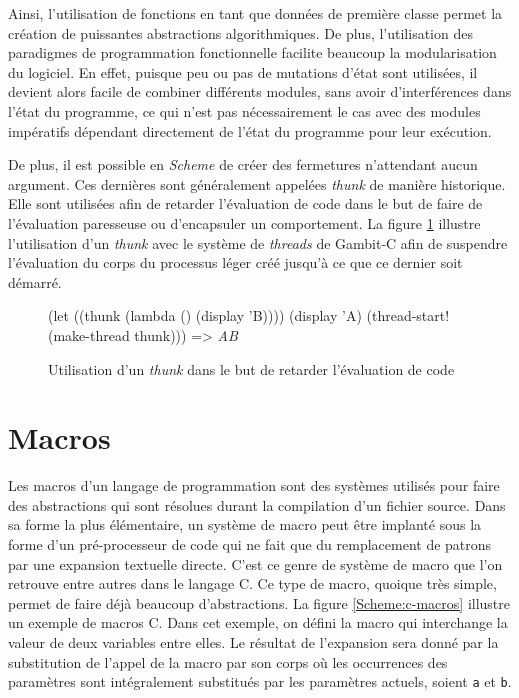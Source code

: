 \documentclass[12pt,twoside,letterpaper,francais]{book}
\newcommand{\Schemelang}{{\textit{Scheme }}}
\newcommand{\scheme}[1]{\selectlanguage{english}{\tt #1}\selectlanguage{french}}
\newcommand{\schemeresult}[1]{{\it #1}}
\begin{document}
Ainsi, l'utilisation de fonctions en tant que données de première
classe permet la création de puissantes abstractions
algorithmiques. De plus, l'utilisation des paradigmes de programmation
fonctionnelle facilite beaucoup la modularisation du logiciel. En
effet, puisque peu ou pas de mutations d'état sont utilisées, il
devient alors facile de combiner différents modules, sans avoir
d'interférences dans l'état du programme, ce qui n'est pas
nécessairement le cas avec des modules impératifs dépendant
directement de l'état du programme pour leur exécution.

De plus, il est possible en \Schemelang de créer des fermetures
n'attendant aucun argument. Ces dernières sont généralement appelées
\textit{thunk} de manière historique. Elle sont utilisées afin de
retarder l'évaluation de code dans le but de faire de l'évaluation
paresseuse ou d'encapsuler un comportement. La figure
\ref{Scheme:thunk} illustre l'utilisation d'un \textit{thunk} avec le
système de \textit{threads} de Gambit-C afin de suspendre l'évaluation
du corps du processus léger créé jusqu'à ce que ce dernier soit
démarré.\\

\begin{figure}[htb!]
  \begin{schemecode}
(let ((thunk (lambda () (display 'B))))
  (display 'A)
  (thread-start! (make-thread thunk))) => \schemeresult{AB}
  \end{schemecode}
  \caption{Utilisation d'un \textit{thunk} dans le but de retarder
    l'évaluation de code}
  \label{Scheme:thunk}
\end{figure}


\FloatBarrier
\section{Macros} \label{Scheme:macros}
Les macros d'un langage de programmation sont des systèmes utilisés
pour faire des abstractions qui sont résolues durant la compilation
d'un fichier source. Dans sa forme la plus élémentaire, un système de
macro peut être implanté sous la forme d'un pré-processeur de code qui
ne fait que du remplacement de patrons par une expansion textuelle
directe. C'est ce genre de système de macro que l'on retrouve entre
autres dans le langage C. Ce type de macro, quoique très simple,
permet de faire déjà beaucoup d'abstractions. La figure
\ref{Scheme:c-macros} illustre un exemple de macros C. Dans cet
exemple, on défini la macro \scheme{swap} qui interchange la valeur de
deux variables entre elles. Le résultat de l'expansion sera donné par
la substitution de l'appel de la macro par son corps où les
occurrences des paramètres sont intégralement substitués par les
paramètres actuels, soient \texttt{a} et \texttt{b}.\\
\end{document}
